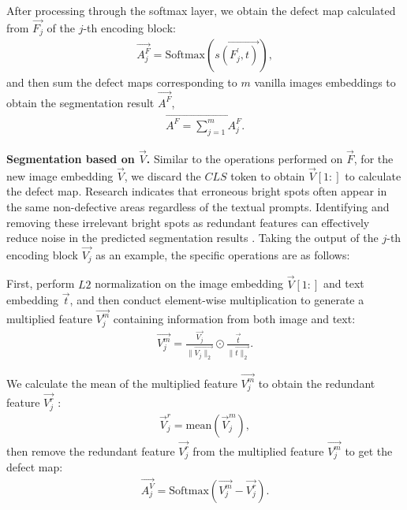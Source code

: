 After processing through the softmax layer, we obtain the defect map calculated from $\vec{F_{j}}$ of the $j$-th encoding block:
\begin{align}
\vec{A_j^F} = \text{Softmax}(\vec{s(F_{j}^{'}, t)}),
\end{align}
and then sum the defect maps corresponding to $ m $ vanilla images embeddings to obtain the segmentation result $\vec{A^F}$,
\begin{align}
\vec{A^F = \sum_{j=1}^{m} A_j^F}.
\end{align}

\noindent
\textbf{Segmentation based on $\vec{V}$.}
Similar to the operations performed on $\vec{F}$, for the new image embedding $\vec{V}$, we discard the $CLS$ token to obtain $\vec{V}[1:]$ 
to calculate the defect map.
Research indicates that erroneous bright spots often appear in the same non-defective areas regardless of the textual prompts. Identifying and removing these irrelevant bright spots as redundant features can effectively reduce noise in the predicted segmentation results \cite{li2023clip}.
Taking the output of the $j$-th encoding block $\vec{V_{j}}$ as an example, the specific operations are as follows:

First, perform $L2$ normalization on the image embedding $\vec{V}[1:]$ and text embedding $\vec{t}$, and then conduct element-wise multiplication to generate a multiplied feature $\vec{V_{j}^{m}}$ containing information from both image and text:
\begin{align}
\vec{V_j^m} = \frac{\vec{V_j}}{\|\vec{V_j\|_2}} \odot \frac{\vec{t}}{\|\vec{t\|_2}}.
\end{align}

We calculate the mean of the multiplied feature $\vec{V_{j}^{m}}$ to obtain the redundant feature $\vec{V_j^r}$ :
\begin{align}
\vec{V}_j^r = \text{mean}(\vec{V}_j^m),
\end{align}
then remove the redundant feature $\vec{V_j^r}$ from the multiplied feature $\vec{V_{j}^{m}}$ to get the defect map:
\begin{align}
\vec{A^V_j} = \text{Softmax}(\vec{V_j^m} - \vec{V_j^r}). 
\end{align}

